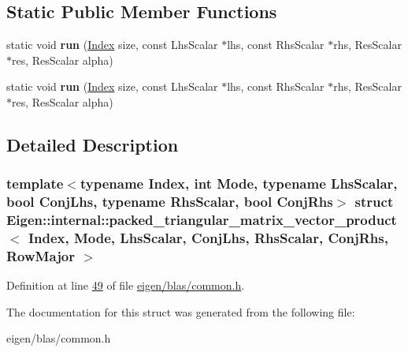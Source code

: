\subsection*{Static Public Member Functions}
\begin{DoxyCompactItemize}
\item 
\mbox{\label{struct_eigen_1_1internal_1_1packed__triangular__matrix__vector__product_3_01_index_00_01_mode_00f4369f0f3f5b783c4128c16d4e97f7b3_a58975840ebc4fc9e88ba58c3a9badb67}} 
static void {\bfseries run} (\hyperlink{namespace_eigen_a62e77e0933482dafde8fe197d9a2cfde}{Index} size, const Lhs\+Scalar $\ast$lhs, const Rhs\+Scalar $\ast$rhs, Res\+Scalar $\ast$res, Res\+Scalar alpha)
\item 
\mbox{\label{struct_eigen_1_1internal_1_1packed__triangular__matrix__vector__product_3_01_index_00_01_mode_00f4369f0f3f5b783c4128c16d4e97f7b3_a58975840ebc4fc9e88ba58c3a9badb67}} 
static void {\bfseries run} (\hyperlink{namespace_eigen_a62e77e0933482dafde8fe197d9a2cfde}{Index} size, const Lhs\+Scalar $\ast$lhs, const Rhs\+Scalar $\ast$rhs, Res\+Scalar $\ast$res, Res\+Scalar alpha)
\end{DoxyCompactItemize}


\subsection{Detailed Description}
\subsubsection*{template$<$typename Index, int Mode, typename Lhs\+Scalar, bool Conj\+Lhs, typename Rhs\+Scalar, bool Conj\+Rhs$>$\newline
struct Eigen\+::internal\+::packed\+\_\+triangular\+\_\+matrix\+\_\+vector\+\_\+product$<$ Index, Mode, Lhs\+Scalar, Conj\+Lhs, Rhs\+Scalar, Conj\+Rhs, Row\+Major $>$}



Definition at line \hyperlink{eigen_2blas_2common_8h_source_l00049}{49} of file \hyperlink{eigen_2blas_2common_8h_source}{eigen/blas/common.\+h}.



The documentation for this struct was generated from the following file\+:\begin{DoxyCompactItemize}
\item 
eigen/blas/common.\+h\end{DoxyCompactItemize}

